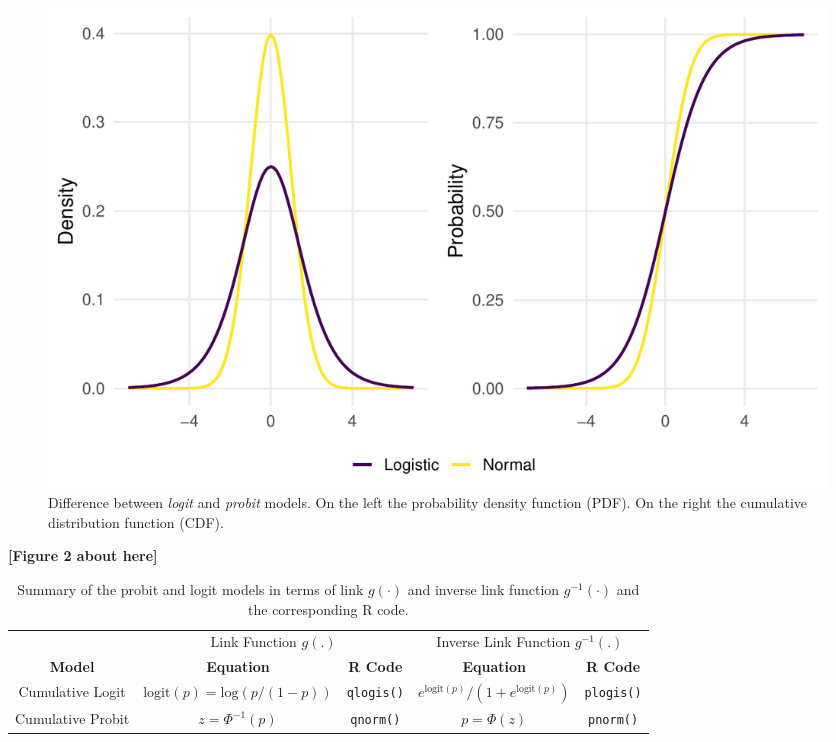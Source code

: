 \documentclass[
  man,floatsintext]{apa6}
\begin{document}
\scriptsize

\begin{figure}

{\centering \includegraphics[width=1\linewidth]{paper_files/figure-latex/fig-logit-vs-probit-1} 

}

\caption{Difference between \emph{logit} and \emph{probit} models. On the left the probability density function (PDF). On the right the cumulative distribution function (CDF).}\label{fig:fig-logit-vs-probit}
\end{figure}

\begin{center}\textbf{[Figure 2 about here]} \end{center}

\normalsize

\scriptsize

\normalsize

\scriptsize

\begin{table}
\centering
\caption{\label{tab:tab-model-summary-latex}Summary of the probit and logit models in terms of link \(g(\cdot)\) and inverse link function \(g^{-1}(\cdot)\) and the corresponding R code.}
\centering
\begin{tabular}[t]{ccccc}
\toprule
\multicolumn{1}{c}{} & \multicolumn{2}{c}{Link Function $g(.)$} & \multicolumn{2}{c}{Inverse Link Function $g^{-1}(.)$} \\
\cmidrule(l{3pt}r{3pt}){2-3} \cmidrule(l{3pt}r{3pt}){4-5}
\textbf{Model} & \textbf{Equation} & \textbf{R Code} & \textbf{Equation} & \textbf{R Code}\\
\midrule
Cumulative Logit & $\text{logit}(p) = \text{log}(p / (1-p))$ & \texttt{qlogis()} & $e^{\text{logit}(p)} / (1 + e^{\text{logit}(p)})$ & \texttt{plogis()}\\
Cumulative Probit & $z = \Phi^{-1}(p)$ & \texttt{qnorm()} & $p = \Phi(z)$ & \texttt{pnorm()}\\
\bottomrule
\end{tabular}
\end{table}
\end{document}
